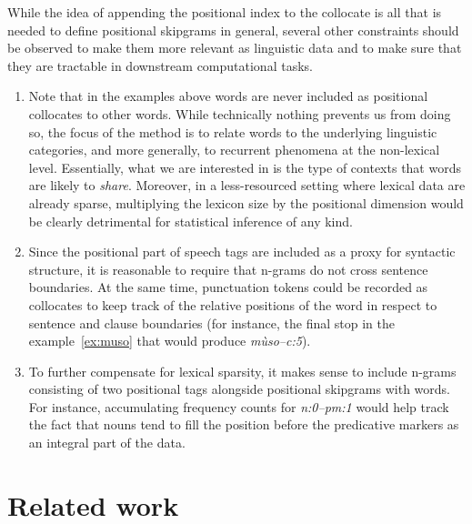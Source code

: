 \documentclass[12pt]{article}
\begin{document}
While the idea of appending the positional index to the collocate is all that
is needed to define positional skipgrams in general, several other
constraints should be observed to make them more relevant as
linguistic data and to make sure that they are tractable in
downstream computational tasks.

\begin{enumerate}
\item Note that in the examples above words are never included as
  positional collocates to other words. While technically nothing
  prevents us from doing so, the focus of the method is to relate
  words to the underlying linguistic categories, and more generally,
  to recurrent phenomena at the non-lexical level.  Essentially, what
  we are interested in is the type of contexts that words are likely
  to \textit{share}.  Moreover, in a less-resourced setting where
  lexical data are already sparse, multiplying the lexicon size by the
  positional dimension would be clearly detrimental for statistical
  inference of any kind.
\item Since the positional part of speech tags are included as a proxy
  for syntactic structure, it is reasonable to require that n-grams do
  not cross sentence boundaries.  At the same time, punctuation tokens
  could be recorded as collocates to keep track of the relative
  positions of the word in respect to sentence and clause boundaries
  (for instance, the final stop in the example~\ref{ex:muso} that would
  produce \textit{mùso--c:5}).
\item To further compensate for lexical sparsity, it makes sense to
  include n-grams consisting of two positional tags alongside
  positional skipgrams with words. For instance, accumulating
  frequency counts for \textit{n:0--pm:1} would help track the
  fact that nouns tend to fill the position before the predicative
  markers as an integral part of the data.
\end{enumerate} 


\section{Related work}
\end{document}
